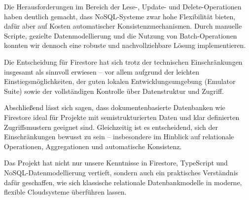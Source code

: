 \documentclass[12pt,a4paper%
              ,oneside     %
              ,titlepage
              ,DIV=13
              ,headinclude
              ,footinclude=false%
              ,cleardoublepage=empty%
              ,parskip=half,
              BCOR=0mm,
              ]{scrreprt}
\begin{document}
Die Herausforderungen im Bereich der Lese-, Update- und Delete-Operationen haben deutlich gemacht, dass NoSQL-Systeme zwar hohe Flexibilität bieten, dafür aber auf Kosten automatischer Konsistenzmechanismen. Durch manuelle Scripte, gezielte Datenmodellierung und die Nutzung von Batch-Operationen konnten wir dennoch eine robuste und nachvollziehbare Lösung implementieren.

Die Entscheidung für Firestore hat sich trotz der technischen Einschränkungen insgesamt als sinnvoll erwiesen – vor allem aufgrund der leichten Einstiegsmöglichkeiten, der guten lokalen Entwicklungsumgebung (Emulator Suite) sowie der vollständigen Kontrolle über Datenstruktur und Zugriff.

Abschließend lässt sich sagen, dass dokumentenbasierte Datenbanken wie Firestore ideal für Projekte mit semistrukturierten Daten und klar definierten Zugriffsmustern geeignet sind. Gleichzeitig ist es entscheidend, sich der Einschränkungen bewusst zu sein – insbesondere im Hinblick auf relationale Operationen, Aggregationen und automatische Konsistenz.

Das Projekt hat nicht nur unsere Kenntnisse in Firestore, TypeScript und NoSQL-Datenmodellierung vertieft, sondern auch ein praktisches Verständnis dafür geschaffen, wie sich klassische relationale Datenbankmodelle in moderne, flexible Cloudsysteme überführen lassen.


\appendix




\renewcommand{\bibfont}{\footnotesize}
\printbibliography[title={Literaturverzeichnis}, 
                   heading=bibintoc]


{ %
\printindex
}
\end{document}
